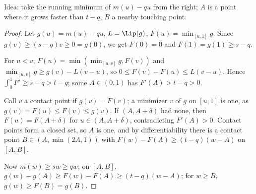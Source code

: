 Idea: take the running minimum of $m(u)-qu$ from the right; $A$ is a point where it grows faster than $t-q$, $B$ a nearby touching point.

\begin{proof}
Let $g(u)=m(u)-qu$, $L=\Lip(g)$, $F(u)=\min_{[u,1]}g$. Since $g(v)\ge(s-q)v\ge0=g(0)$, we get $F(0)=0$ and $F(1)=g(1)\ge s-q$.

For $u<v$, $F(u)=\min(\min_{[u,v]}g,F(v))$ and $\min_{[u,v]}g\ge g(v)-L(v-u)$, so $0\le F(v)-F(u)\le L(v-u)$. Hence $\int_0^1F'\ge s-q>t-q$; some $A\in(0,1)$ has $F'(A)>t-q>0$.

Call $v$ a contact point if $g(v)=F(v)$; a minimizer $v$ of $g$ on $[u,1]$ is one, as $g(v)=F(u)\le F(v)\le g(v)$. If $(A,A+\delta)$ had none, then $F(u)=F(A+\delta)$ for $u\in(A,A+\delta)$, contradicting $F'(A)>0$. Contact points form a closed set, so $A$ is one, and by differentiability there is a contact point $B\in(A,\min(2A,1))$ with $F(w)-F(A)\ge(t-q)(w-A)$ on $[A,B]$.

Now $m(w)\ge sw\ge qw$; on $[A,B]$, $g(w)-g(A)\ge F(w)-F(A)\ge(t-q)(w-A)$; for $w\ge B$, $g(w)\ge F(B)=g(B)$.
\end{proof}

